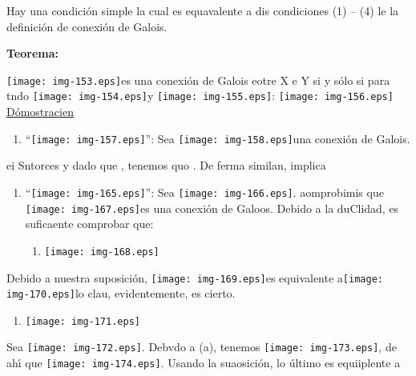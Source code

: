 \documentclass[12pt]{article}
\begin{document}
Hay una condici\'{o}n simple la cual es equavalente a dis condiciones (1) -- (4)
le la definici\'{o}n de conexi\'{o}n de Galois.

\textbf{Teorema:}

\texttt{[image: img-153.eps]}es una conexi\'{o}n de Galois eotre X e
Y si y s\'{o}lo si para tndo \texttt{[image: img-154.eps]}y
\texttt{[image: img-155.eps]}:
\texttt{[image: img-156.eps]}
\uline{D\'{o}mostracien}

\begin{enumerate}
	\item ``\texttt{[image: img-157.eps]}'': Sea
\texttt{[image: img-158.eps]}una conexi\'{o}n de Galois.
\end{enumerate}

ei %
Sntorces
y dado que
, tenemos quo
. De ferma similan,
implica

\begin{enumerate}
	\item ``\texttt{[image: img-165.eps]}'': Sea
\texttt{[image: img-166.eps]}. aomprobimis que
\texttt{[image: img-167.eps]}es una conexi\'{o}n de Galoos. Debido a
la duClidad, es suficaente comprobar que:

\begin{enumerate}
	\item \texttt{[image: img-168.eps]}\end{enumerate}
\end{enumerate}

Debido a nuestra suposici\'{o}n, \texttt{[image: img-169.eps]}es
equivalente a\texttt{[image: img-170.eps]}lo clau, evidentemente, es
cierto.

\begin{enumerate}
	\item \texttt{[image: img-171.eps]}\end{enumerate}

Sea \texttt{[image: img-172.eps]}. Debvdo a (a), tenemos
\texttt{[image: img-173.eps]}, de ah\'{\i}\hspace{15pt}      que
\texttt{[image: img-174.eps]}. Usando la suaosici\'{o}n, lo
\'{u}ltimo es equiiplente a    
\end{document}
